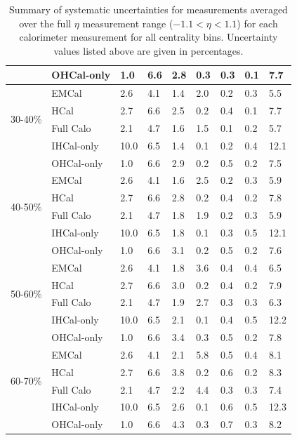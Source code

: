 \begin{table}
\begin{tabular}{ |p{1.3cm}|p{2.1cm}|p{1.0cm}|p{1.0cm}|p{1.0cm}|p{1.0cm}|p{1.3cm}|p{1.0cm}|p{1.0cm}|  }
& OHCal-only                     & 1.0  & 6.6 & 2.8 & 0.3 & 0.3 & 0.1 & 7.7 \\
\hline
\multirow{4}{*}{30-40\%}& EMCal  & 2.6  & 4.1 & 1.4 & 2.0 & 0.2 & 0.3 & 5.5 \\
& HCal                           & 2.7  & 6.6 & 2.5 & 0.2 & 0.4 & 0.1 & 7.7 \\
& Full Calo                      & 2.1  & 4.7 & 1.6 & 1.5 & 0.1 & 0.2 & 5.7 \\
& IHCal-only                     & 10.0 & 6.5 & 1.4 & 0.1 & 0.2 & 0.4 & 12.1 \\
& OHCal-only                     & 1.0  & 6.6 & 2.9 & 0.2 & 0.5 & 0.2 & 7.5 \\
\hline
\multirow{4}{*}{40-50\%}& EMCal  & 2.6  & 4.1 & 1.6 & 2.5 & 0.2 & 0.3 & 5.9 \\
& HCal                           & 2.7  & 6.6 & 2.8 & 0.2 & 0.4 & 0.2 & 7.8 \\
& Full Calo                      & 2.1  & 4.7 & 1.8 & 1.9 & 0.2 & 0.3 & 5.9 \\
& IHCal-only                     & 10.0 & 6.5 & 1.8 & 0.1 & 0.3 & 0.5 & 12.1 \\
& OHCal-only                     & 1.0  & 6.6 & 3.1 & 0.2 & 0.5 & 0.2 & 7.6 \\
\hline
\multirow{4}{*}{50-60\%}& EMCal  & 2.6  & 4.1 & 1.8 & 3.6 & 0.4 & 0.4 & 6.5 \\
& HCal                           & 2.7  & 6.6 & 3.0 & 0.2 & 0.4 & 0.2 & 7.9 \\
& Full Calo                      & 2.1  & 4.7 & 1.9 & 2.7 & 0.3 & 0.3 & 6.3 \\
& IHCal-only                     & 10.0 & 6.5 & 2.1 & 0.1 & 0.4 & 0.5 & 12.2 \\
& OHCal-only                     & 1.0  & 6.6 & 3.4 & 0.3 & 0.5 & 0.2 & 7.8 \\
\hline
\multirow{4}{*}{60-70\%}& EMCal  & 2.6  & 4.1 & 2.1 & 5.8 & 0.5 & 0.4 & 8.1 \\
& HCal                           & 2.7  & 6.6 & 3.8 & 0.2 & 0.6 & 0.2 & 8.3 \\
& Full Calo                      & 2.1  & 4.7 & 2.2 & 4.4 & 0.3 & 0.3 & 7.4 \\
& IHCal-only                     & 10.0 & 6.5 & 2.6 & 0.1 & 0.6 & 0.5 & 12.3 \\
& OHCal-only                     & 1.0  & 6.6 & 4.3 & 0.3 & 0.7 & 0.3 & 8.2 \\
\hline
\end{tabular}
\caption{Summary of systematic uncertainties for \detdeta measurements averaged over the full $\eta$ measurement range ($-1.1 < \eta < 1.1$) for each calorimeter measurement for all centrality bins. Uncertainty values listed above are given in percentages.}
\label{table:SystUncertainties}
\end{table}


